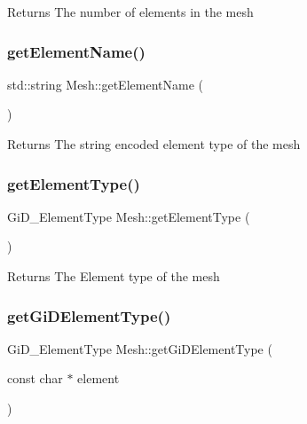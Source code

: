 \begin{DoxyReturn}{Returns}
The number of elements in the mesh 
\end{DoxyReturn}
\mbox{\label{classMesh_a59688b2769be829f3142662d5dec4855}} 
\subsubsection{\texorpdfstring{get\+Element\+Name()}{getElementName()}}
{\footnotesize\ttfamily std\+::string Mesh\+::get\+Element\+Name (\begin{DoxyParamCaption}{ }\end{DoxyParamCaption})}

\begin{DoxyReturn}{Returns}
The string encoded element type of the mesh 
\end{DoxyReturn}
\mbox{\label{classMesh_aafbb679e494fcebacd811384bc3d9e29}} 
\subsubsection{\texorpdfstring{get\+Element\+Type()}{getElementType()}}
{\footnotesize\ttfamily Gi\+D\+\_\+\+Element\+Type Mesh\+::get\+Element\+Type (\begin{DoxyParamCaption}{ }\end{DoxyParamCaption})}

\begin{DoxyReturn}{Returns}
The Element type of the mesh 
\end{DoxyReturn}
\mbox{\label{classMesh_aec161b91369a8f24ce2fa333547a7eef}} 
\subsubsection{\texorpdfstring{get\+Gi\+D\+Element\+Type()}{getGiDElementType()}}
{\footnotesize\ttfamily Gi\+D\+\_\+\+Element\+Type Mesh\+::get\+Gi\+D\+Element\+Type (\begin{DoxyParamCaption}\item[{const char $\ast$}]{element }\end{DoxyParamCaption})\hspace{0.3cm}{\ttfamily [static]}}




